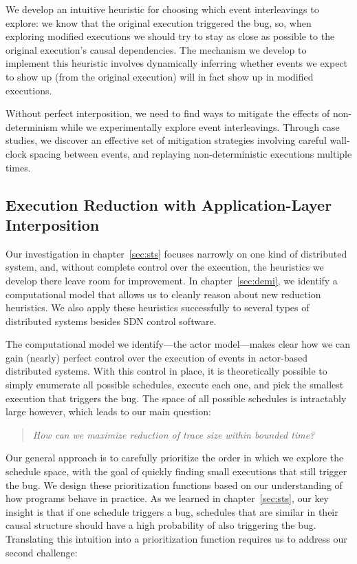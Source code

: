 We develop an intuitive heuristic for
choosing which event interleavings to explore: we know that the original execution triggered the bug, so, when exploring modified executions we should try to stay as close as possible to the original execution's causal dependencies.
The mechanism we develop to implement this heuristic involves dynamically inferring whether events we expect to show up (from the original execution) will in fact show up in modified executions.

Without perfect interposition, we need to find ways to mitigate the effects of
non-determinism while we experimentally explore event interleavings.
Through case studies, we discover an effective set of mitigation strategies involving careful wall-clock spacing between events, and replaying non-deterministic executions multiple times.

\subsection{Execution Reduction with Application-Layer Interposition}

Our investigation in chapter~\ref{sec:sts} focuses narrowly on one kind of
distributed system, and, without complete control over the execution, the heuristics we
develop there leave room for improvement. In chapter~\ref{sec:demi},
we identify a computational model that allows us to cleanly reason
about new reduction heuristics. We also apply these heuristics successfully
to several types of distributed systems besides SDN control software.

The computational model we identify---the actor model---makes clear how we can gain (nearly) perfect control over the execution of events in actor-based distributed systems.
With this control in place, it is theoretically possible to simply enumerate all possible schedules, execute each one, and pick the smallest execution that triggers the bug.
The space of all possible schedules is intractably large however, which leads to our main question:

\begin{quote}
\textit{How can we maximize reduction of trace size within bounded time?}
\end{quote}

Our general approach is to carefully prioritize the order in which we explore
the schedule space, with the goal of quickly finding small executions that
still trigger the bug. We design these prioritization functions based on our
understanding of how programs behave in practice. As we learned in
chapter~\ref{sec:sts}, our key insight is that if one schedule triggers a bug, schedules that are similar in their causal structure should have a high probability of also triggering the bug.
Translating this intuition into a prioritization function requires us to address our second challenge:

